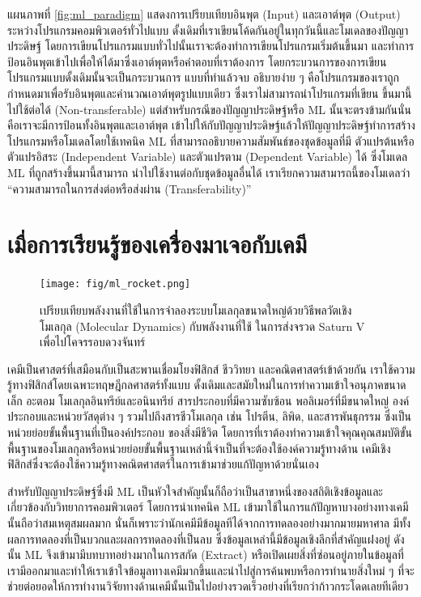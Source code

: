 แผนภาพที่ \ref{fig:ml_paradigm} แสดงการเปรียบเทียบอินพุต (Input) และเอาต์พุต (Output) ระหว่างโปรแกรมคอมพิวเตอร์ทั่วไปแบบ%
ดั้งเดิมที่เราเขียนโค้ดกันอยู่ในทุกวันนี้และโมเดลของปัญญาประดิษฐ์ โดยการเขียนโปรแกรมแบบทั่วไปนั้นเราจะต้องทำการเขียนโปรแกรมเริ่มต้นขึ้นมา%
และทำการป้อนอินพุตเข้าไปเพื่อให้ได้มาซึ่งเอาต์พุตหรือคำตอบที่เราต้องการ โดยกระบวนการของการเขียนโปรแกรมแบบดั้งเดิมนั้นจะเป็นกระบวนการ%
แบบที่ทำแล้วจบ อธิบายง่าย ๆ คือโปรแกรมของเราถูกกำหนดมาเพื่อรับอินพุตและคำนวณเอาต์พุตรูปแบบเดียว ซึ่งเราไม่สามารถนำโปรแกรมที่เขียน%
ขึ้นมานี้ไปใช้ต่อได้ (Non-transferable) แต่สำหรับกรณีของปัญญาประดิษฐ์หรือ ML นั้นจะตรงข้ามกันนั่นคือเราจะมีการป้อนทั้งอินพุตและเอาต์พุต%
เข้าไปให้กับปัญญาประดิษฐ์แล้วให้ปัญญาประดิษฐ์ทำการสร้างโปรแกรมหรือโมเดลโดยใช้เทคนิค ML ที่สามารถอธิบายความสัมพันธ์ของชุดข้อมูลที่มี%
ตัวแปรต้นหรือตัวแปรอิสระ (Independent Variable) และตัวแปรตาม (Dependent Variable) ได้ ซึ่งโมเดล ML ที่ถูกสร้างขึ้นมานี้สามารถ%
นำไปใช้งานต่อกับชุดข้อมูลอื่นได้ เราเรียกความสามารถนี้ของโมเดลว่า \enquote{ความสามารถในการส่งต่อหรือส่งผ่าน (Transferability)}

\section{เมื่อการเรียนรู้ของเครื่องมาเจอกับเคมี}
\label{sec:ml_meets_chem}

\begin{figure}[htbp]
    \centering
    \texttt{[image: fig/ml\_rocket.png]}
    \caption{เปรียบเทียบพลังงานที่ใช้ในการจำลองระบบโมเลกุลขนาดใหญ่ด้วยวิธีพลวัตเชิงโมเลกุล (Molecular Dynamics) กับพลังงานที่ใช้%
    ในการส่งจรวด Saturn V เพื่อไปโคจรรอบดวงจันทร์}
    \label{fig:ml_rocket}
\end{figure}

เคมีเป็นศาสตร์ที่เสมือนกับเป็นสะพานเชื่อมโยงฟิสิกส์ ชีววิทยา และคณิตศาสตร์เข้าด้วยกัน เราใช้ความรู้ทางฟิสิกส์โดยเฉพาะทฤษฎีกลศาสตร์ทั้งแบบ%
ดั้งเดิมและสมัยใหม่ในการทำความเข้าใจอนุภาคขนาดเล็ก อะตอม โมเลกุลอินทรีย์และอนินทรีย์ สารประกอบที่มีความซับซ้อน พอลิเมอร์ที่มีขนาดใหญ่ 
องค์ประกอบและหน่วยวัสดุต่าง ๆ รวมไปถึงสารชีวโมเลกุล เช่น โปรตีน, ลิพิด, และสารพันธุกรรม ซึ่งเป็นหน่วยย่อยขั้นพื้นฐานที่เป็นองค์ประกอบ%
ของสิ่งมีชีวิต โดยการที่เราต้องทำความเข้าใจคุณคุณสมบัติขั้นพื้นฐานของโมเลกุลหรือหน่วยย่อยขั้นพื้นฐานเหล่านี้จำเป็นที่จะต้องใช้องค์ความรู้ทางด้าน%
เคมีเชิงฟิสิกส์ซึ่งจะต้องใช้ความรู้ทางคณิตศาสตร์ในการเข้ามาช่วยแก้ปัญหาด้วยนั่นเอง

สำหรับปัญญาประดิษฐ์ซึ่งมี ML เป็นหัวใจสำคัญนั้นก็ถือว่าเป็นสาขาหนึ่งของสถิติเชิงข้อมูลและเกี่ยวข้องกับวิทยาการคอมพิวเตอร์ โดยการนำเทคนิค 
ML เข้ามาใช้ในการแก้ปัญหาบางอย่างทางเคมีนั้นถือว่าสมเหตุสมผลมาก นั่นก็เพราะว่านักเคมีมีข้อมูลทีได้จากการทดลองอย่างมากมายมหาศาล 
มีทั้งผลการทดลองที่เป็นบวกและผลการทดลองที่เป็นลบ ซึ่งข้อมูลเหล่านี้มีข้อมูลเชิงลึกที่สำคัญแฝงอยู่ ดังนั้น ML จึงเข้ามามีบทบาทอย่างมากในการสกัด 
(Extract) หรือเปิดเผยสิ่งที่ซ่อนอยู่ภายในข้อมูลที่เรามีออกมาและทำให้เราเข้าใจข้อมูลทางเคมีมากขึ้นและนำไปสู่การค้นพบหรือการทำนายสิ่งใหม่ ๆ 
ที่จะช่วยต่อยอดให้การทำงานวิจัยทางด้านเคมีนั้นเป็นไปอย่างรวดเร็วอย่างที่เรียกว่าก้าวกระโดดเลยทีเดียว\autocite{cartwright2020,zotero-817}

